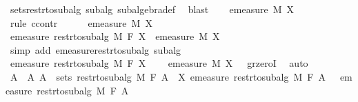 \begin{isabellebody}
\ sets{\isacharunderscore}{\kern0pt}restr{\isacharunderscore}{\kern0pt}to{\isacharunderscore}{\kern0pt}subalg\ subalg\ subalgebra{\isacharunderscore}{\kern0pt}def\ \isamarkupfalse%
\ blast\isanewline
\ \ \isamarkupfalse%
\ {\isachardoublequoteopen}emeasure\ M\ X\ {\isacharequal}{\kern0pt}\ {}{\isachardoublequoteclose}\isanewline
\ \ \isamarkupfalse%
\ {\isacharparenleft}{\kern0pt}rule\ ccontr{\isacharparenright}{\kern0pt}\isanewline
\ \ \ \ \isamarkupfalse%
\ {\isachardoublequoteopen}emeasure\ M\ X\ {\isasymnoteq}\ {}{\isachardoublequoteclose}\isanewline
\ \ \ \ \isamarkupfalse%
\ {\isachardoublequoteopen}emeasure\ {\isacharparenleft}{\kern0pt}restr{\isacharunderscore}{\kern0pt}to{\isacharunderscore}{\kern0pt}subalg\ M\ F{\isacharparenright}{\kern0pt}\ X\ {\isacharequal}{\kern0pt}\ emeasure\ M\ X{\isachardoublequoteclose}\ \isamarkupfalse%
\ {\isacharparenleft}{\kern0pt}simp\ add{\isacharcolon}{\kern0pt}\ emeasure{\isacharunderscore}{\kern0pt}restr{\isacharunderscore}{\kern0pt}to{\isacharunderscore}{\kern0pt}subalg\ subalg{\isacharparenright}{\kern0pt}\isanewline
\ \ \ \ \isamarkupfalse%
\ {\isachardoublequoteopen}emeasure\ {\isacharparenleft}{\kern0pt}restr{\isacharunderscore}{\kern0pt}to{\isacharunderscore}{\kern0pt}subalg\ M\ F{\isacharparenright}{\kern0pt}\ X\ {\isachargreater}{\kern0pt}\ {}{\isachardoublequoteclose}\ \isamarkupfalse%
\ {\isacartoucheopen}{\isasymnot}{\isacharparenleft}{\kern0pt}emeasure\ M\ X{\isacharparenright}{\kern0pt}\ {\isacharequal}{\kern0pt}\ {}{\isacartoucheclose}\ gr{\isacharunderscore}{\kern0pt}zeroI\ \isamarkupfalse%
\ auto\isanewline
\ \ \ \ \isamarkupfalse%
\ \isamarkupfalse%
\ A\ \ A{\isacharcolon}{\kern0pt}\ {\isachardoublequoteopen}A\ {\isasymin}\ sets\ {\isacharparenleft}{\kern0pt}restr{\isacharunderscore}{\kern0pt}to{\isacharunderscore}{\kern0pt}subalg\ M\ F{\isacharparenright}{\kern0pt}{\isachardoublequoteclose}\ {\isachardoublequoteopen}A\ {\isasymsubseteq}\ X{\isachardoublequoteclose}\ {\isachardoublequoteopen}emeasure\ {\isacharparenleft}{\kern0pt}restr{\isacharunderscore}{\kern0pt}to{\isacharunderscore}{\kern0pt}subalg\ M\ F{\isacharparenright}{\kern0pt}\ A\ {\isachargreater}{\kern0pt}\ {}{\isachardoublequoteclose}\ {\isachardoublequoteopen}emeasure\ {\isacharparenleft}{\kern0pt}restr{\isacharunderscore}{\kern0pt}to{\isacharunderscore}{\kern0pt}subalg\ M\ F{\isacharparenright}{\kern0pt}\ A\ {\isacharless}{\kern0pt}\ {\isasyminfinity}{\isachardoublequoteclose}\isanewline

\end{isabellebody}

